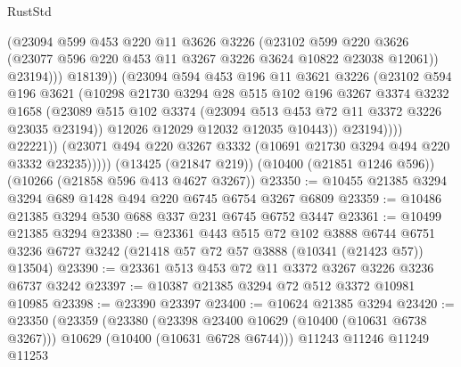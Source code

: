 \begin{lexlean}{RustStd}
\begin{coremodule}
{\begin{coremodule}
{{{{{{{{{{{{{{{{{{{{{{{{{                            (@23094
                              @599
                              @453
                              @220
                              @11
                              @3626
                              @3226
                              (@23102
                                @599
                                @220
                                @3626
                                (@23077 @596 @220 @453 @11 @3267 @3226 @3624 @10822 @23038 @12061))
                              @23194)))
                        @18139))
                    (@23094
                      @594
                      @453
                      @196
                      @11
                      @3621
                      @3226
                      (@23102
                        @594
                        @196
                        @3621
                        (@10298
                          @21730
                          @3294
                          @28
                          @515
                          @102
                          @196
                          @3267
                          @3374
                          @3232
                          @1658
                          (@23089
                            @515
                            @102
                            @3374
                            (@23094 @513 @453 @72 @11 @3372 @3226 @23035 @23194))
                          @12026
                          @12029
                          @12032
                          @12035
                          @10443))
                      @23194))))
              @22221))
          (@23071 @494 @220 @3267 @3332 (@10691 @21730 @3294 @494 @220 @3332 @23235)))))
    (@13425 (@21847 @219))
    (@10400 (@21851 @1246 @596))
    (@10266 (@21858 @596 @413 @4627 @3267))
@23350 := @10455 @21385 @3294 @3294 @689 @1428 @494 @220 @6745 @6754 @3267 @6809
@23359 := @10486 @21385 @3294 @530 @688 @337 @231 @6745 @6752 @3447
@23361 := @10499 @21385 @3294
@23380 := @23361
    @443
    @515
    @72
    @102
    @3888
    @6744
    @6751
    @3236
    @6727
    @3242
    (@21418 @57 @72 @57 @3888 (@10341 (@21423 @57)) @13504)
@23390 := @23361 @513 @453 @72 @11 @3372 @3267 @3226 @3236 @6737 @3242
@23397 := @10387 @21385 @3294 @72 @512 @3372 @10981 @10985
@23398 := @23390 @23397
@23400 := @10624 @21385 @3294
@23420 := @23350
    (@23359
      (@23380
        (@23398 @23400 @10629 (@10400 (@10631 @6738 @3267)))
        @10629
        (@10400 (@10631 @6728 @6744)))
      @11243
      @11246
      @11249
      @11253
}}}}}}}}}}}}}}}}}}}}}}}}}
\end{coremodule}}
\end{coremodule}
\end{lexlean}
